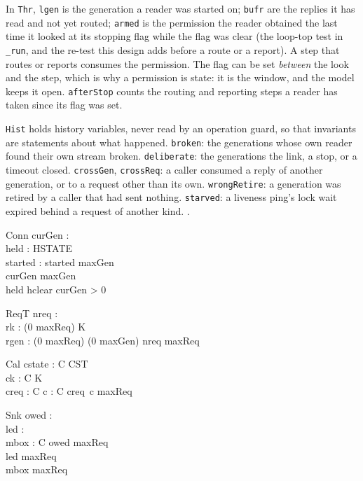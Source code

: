 \documentclass[a4paper,10pt,fleqn]{article}
\begin{document}
In \texttt{Thr}, \texttt{lgen} is the generation a reader was started on;
\texttt{bufr} are the replies it has read and not yet routed;
\texttt{armed} is the permission the reader obtained the last time it looked
at its stopping flag while the flag was clear (the loop-top test in
\texttt{\_run}, and the re-test this design adds before a route or a report).
A step that routes or reports consumes the permission.  The flag can be set
\emph{between} the look and the step, which is why a permission is state: it
is the window, and the model keeps it open.  \texttt{afterStop} counts the
routing and reporting steps a reader has taken since its flag was set.

\texttt{Hist} holds history variables, never read by an operation guard, so
that invariants are statements about what happened.  \texttt{broken}: the
generations whose own reader found their own stream broken.
\texttt{deliberate}: the generations the link, a stop, or a timeout closed.
\texttt{crossGen}, \texttt{crossReq}: a caller consumed a reply of another
generation, or to a request other than its own.  \texttt{wrongRetire}: a
generation was retired by a caller that had sent nothing.  \texttt{starved}: a
liveness ping's lock wait expired behind a request of another kind. .


\begin{schema}{Conn}
  curGen : \nat \\
  held : HSTATE \\
  started : \power \nat
\where
  started  \upto maxGen \\
  curGen \leq maxGen \\
  held \neq hclear \implies curGen > 0
\end{schema}

\begin{schema}{ReqT}
  nreq : \nat \\
  rk : (0 \upto maxReq) \fun K \\
  rgen : (0 \upto maxReq) \fun (0 \upto maxGen)
\where
  nreq \leq maxReq
\end{schema}

\begin{schema}{Cal}
  cstate : C \fun CST \\
  ck : C \fun K \\
  creq : C \fun \nat
\where
  \forall c : C \spot creq~c \leq maxReq
\end{schema}

\begin{schema}{Snk}
  owed : \power \nat \\
  led : \power \nat \\
  mbox : C \pfun \nat
\where
  owed  \upto maxReq \\
  led  \upto maxReq \\
  \ran mbox  \upto maxReq
\end{schema}
\end{document}
